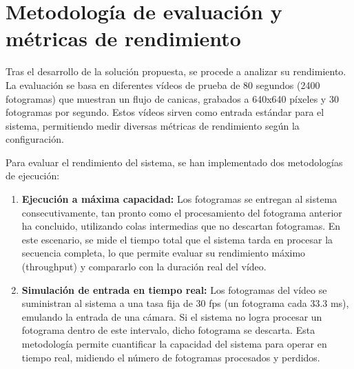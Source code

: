 \documentclass[11pt,spanish,listoffigures,listoftables]{tfgetsinf}
\begin{document}
\section{Metodología de evaluación y métricas de rendimiento} \label{sec:metodologia}

Tras el desarrollo de la solución propuesta, se procede a analizar su rendimiento. La evaluación se basa en diferentes vídeos de prueba de 80 segundos (2400 fotogramas) que muestran un flujo de canicas, grabados a 640x640 píxeles y 30 fotogramas por segundo. Estos vídeos sirven como entrada estándar para el sistema, permitiendo medir diversas métricas de rendimiento según la configuración.

Para evaluar el rendimiento del sistema, se han implementado dos metodologías de ejecución:

\begin{enumerate}
   \item \textbf{Ejecución a máxima capacidad:} Los fotogramas se entregan al sistema consecutivamente, tan pronto como el procesamiento del fotograma anterior ha concluido, utilizando colas intermedias que no descartan fotogramas. En este escenario, se mide el tiempo total que el sistema tarda en procesar la secuencia completa, lo que permite evaluar su rendimiento máximo (throughput) y compararlo con la duración real del vídeo.
   \item \textbf{Simulación de entrada en tiempo real:} Los fotogramas del vídeo se suministran al sistema a una tasa fija de 30 fps (un fotograma cada 33.3 ms), emulando la entrada de una cámara. Si el sistema no logra procesar un fotograma dentro de este intervalo, dicho fotograma se descarta. Esta metodología permite cuantificar la capacidad del sistema para operar en tiempo real, midiendo el número de fotogramas procesados y perdidos.
\end{enumerate}
\end{document}
